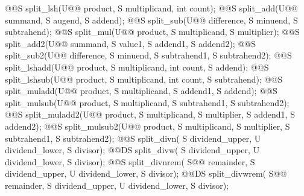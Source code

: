 \begin{addedblock}
\begin{itemdecl}
@@S split_lsh(U@\tcode{\remmodif{*}\addmodif{\&}}@ product, S multiplicand, int count);
@@S split_add(U@\tcode{\remmodif{*}\addmodif{\&}}@ summand, S augend, S addend);
@@S split_sub(U@\tcode{\remmodif{*}\addmodif{\&}}@ difference, S minuend, S subtrahend);
@@S split_mul(U@\tcode{\remmodif{*}\addmodif{\&}}@ product, S multiplicand, S multiplier);
@@S split_add2(U@\tcode{\remmodif{*}\addmodif{\&}}@ summand, S value1, S addend1, S addend2);
@@S split_sub2(U@\tcode{\remmodif{*}\addmodif{\&}}@ difference, S minuend, S subtrahend1, S subtrahend2);
@@S split_lshadd(U@\tcode{\remmodif{*}\addmodif{\&}}@ product, S multiplicand, int count, S addend);
@@S split_lshsub(U@\tcode{\remmodif{*}\addmodif{\&}}@ product, S multiplicand, int count, S subtrahend);
@@S split_muladd(U@\tcode{\remmodif{*}\addmodif{\&}}@ product, S multiplicand, S addend1, S addend);
@@S split_mulsub(U@\tcode{\remmodif{*}\addmodif{\&}}@ product, S multiplicand, S subtrahend1, S subtrahend2);
@@S split_muladd2(U@\tcode{\remmodif{*}\addmodif{\&}}@ product, S multiplicand, S multiplier, S addend1, S addend2);
@@S split_mulsub2(U@\tcode{\remmodif{*}\addmodif{\&}}@ product, S multiplicand, S multiplier, S subtrahend1, S subtrahend2);
@@S split_divn( S dividend_upper, U dividend_lower, S divisor);
@@DS split_divw( S dividend_upper, U dividend_lower, S divisor);
@@S split_divnrem( S@\tcode{\remmodif{*}\addmodif{\&}}@ remainder, S dividend_upper, U dividend_lower, S divisor);
@@DS split_divwrem( S@\tcode{\remmodif{*}\addmodif{\&}}@ remainder, S dividend_upper, U dividend_lower, S divisor);


\end{itemdecl}
\end{addedblock}
